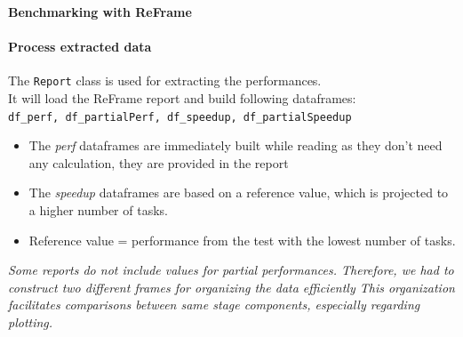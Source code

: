 \documentclass[10pt]{beamer}
\begin{document}
\begin{frame}{\textbf{Benchmarking with ReFrame}}
    \framesubtitle{\textbf{Process extracted data}}
    The \texttt{Report} class is used for extracting the performances. \\
    It will load the ReFrame report and build following dataframes: \\
    \texttt{df\_perf, df\_partialPerf, df\_speedup, df\_partialSpeedup}
    \vspace{10pt}
    \begin{itemize}
        \item The \textit{perf} dataframes are immediately built while reading as they don't need any calculation, they are provided in the report
        \item The \textit{speedup} dataframes are based on a reference value, which is projected to a higher number of tasks. \\
        \item Reference value = performance from the test with the lowest number of tasks.
    \end{itemize}
    \vspace{10pt}
    \textit{Some reports do not include values for partial performances. Therefore, we had to construct two different frames for organizing the data efficiently
            This organization facilitates comparisons between same stage components, especially regarding plotting.}
\end{frame}

\end{document}
